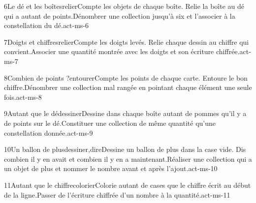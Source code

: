 \begin{activite}{6}{Le dé et les boîtes}{relier}{Compte les objets de chaque boîte. Relie la boîte au dé qui a {\otBold\color{otNavy}autant} de points.}{Dénombrer une collection jusqu’à six et l’associer à la constellation du dé.}{act-ms-6}
\end{activite}
\begin{activite}{7}{Doigts et chiffres}{relier}{Compte les doigts levés. Relie chaque dessin au {\otBold\color{otNavy}chiffre} qui convient.}{Associer une quantité montrée avec les doigts et son écriture chiffrée.}{act-ms-7}
\end{activite}
\begin{activite}{8}{Combien de points ?}{entourer}{Compte les points de chaque carte. Entoure le {\otBold\color{otNavy}bon chiffre}.}{Dénombrer une collection mal rangée en pointant chaque élément une seule fois.}{act-ms-8}
\end{activite}
\begin{activite}{9}{Autant que le dé}{dessiner}{Dessine dans chaque boîte {\otBold\color{otNavy}autant} de pommes qu’il y a de points sur le dé.}{Constituer une collection de même quantité qu’une constellation donnée.}{act-ms-9}
\end{activite}
\begin{activite}{10}{Un ballon de plus}{dessiner,dire}{Dessine {\otBold\color{otNavy}un ballon de plus} dans la case vide. Dis combien il y en avait et combien il y en a maintenant.}{Réaliser une collection qui a un objet de plus et nommer le nombre avant et après l’ajout.}{act-ms-10}
\end{activite}
\begin{activite}{11}{Autant que le chiffre}{colorier}{Colorie {\otBold\color{otNavy}autant} de cases que le chiffre écrit au début de la ligne.}{Passer de l’écriture chiffrée d’un nombre à la quantité.}{act-ms-11}
\end{activite}
